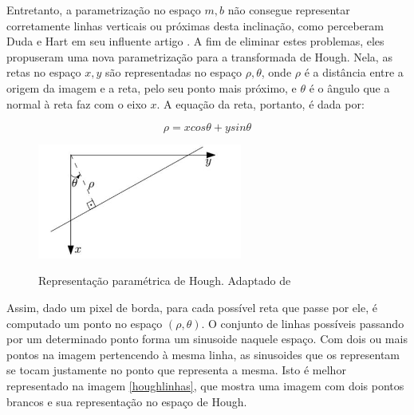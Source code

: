 Entretanto, a parametrização no espaço $m,b$ não consegue representar corretamente linhas verticais ou próximas desta inclinação, como perceberam Duda e Hart em seu influente artigo \cite{houghintro02}. A fim de eliminar estes problemas, eles propuseram uma nova parametrização para a transformada de Hough. Nela, as retas no espaço $x,y$ são representadas no espaço $\rho,\theta$, onde $\rho$ é a distância entre a origem da imagem e a reta, pelo seu ponto mais próximo, e $\theta$ é o ângulo que a normal à reta faz com o eixo $x$. A equação da reta, portanto, é dada por: 

$$\rho = x cos \theta +y sin \theta $$ 



\begin{figure} [h]
\centering
\includegraphics[width = 0.6\textwidth]{figuras/hough.jpg} \label{hough} \caption{Representação paramétrica de Hough. Adaptado de \cite{hough00}}
\end{figure} 


Assim, dado um pixel de borda, para cada possível reta que passe por ele, é computado um ponto no espaço $(\rho,\theta)$. O conjunto de linhas possíveis passando por um determinado ponto forma um sinusoide naquele espaço. Com dois ou mais pontos na imagem pertencendo à mesma linha, as sinusoides que os representam se tocam justamente no ponto que representa a mesma. Isto é melhor representado na imagem \ref{houghlinhas}, que mostra uma imagem com dois pontos brancos e sua representação no espaço de Hough.


